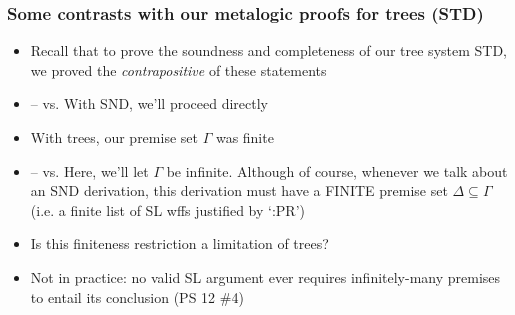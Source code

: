 \begin{frame}
\frametitle{Some contrasts with our metalogic proofs for trees (STD)}

\begin{itemize}[<+->]


\item Recall that to prove the soundness and completeness of our tree system STD, we proved the \textit{contrapositive} of these statements

\item[] -- vs. With SND, we'll proceed directly  %

\item With trees, our premise set $\Gamma$ was finite

\item[] -- vs. Here, we'll let $\Gamma$ be infinite. \footnotesize{Although of course, whenever we talk about an SND derivation, this derivation must have a FINITE premise set $\Delta \subseteq \Gamma$ (i.e. a finite list of SL wffs justified by `:PR')}

\item Is this finiteness restriction a limitation of trees? 

\item Not in practice: no valid SL argument ever requires infinitely-many premises to entail its conclusion (PS 12 \#4) 



\end{itemize}
\end{frame}

